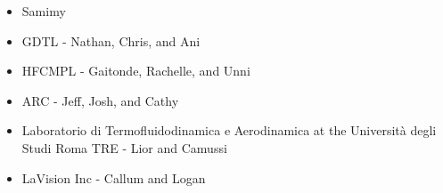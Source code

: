 \begin{acknowledgements}

	\begin{itemize}
		\item Samimy
		\item GDTL - Nathan, Chris, and Ani
		\item HFCMPL - Gaitonde, Rachelle, and Unni
		\item ARC - Jeff, Josh, and Cathy
		\item Laboratorio di Termofluidodinamica e Aerodinamica at the Universit\`{a} degli Studi Roma TRE - Lior and Camussi
		\item LaVision Inc - Callum and Logan
	\end{itemize}

\end{acknowledgements}

